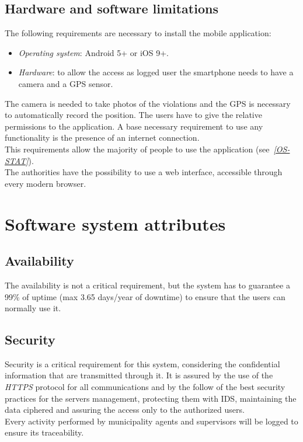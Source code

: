 \documentclass[a4paper]{report}
\begin{document}
\subsection{Hardware and software limitations}
The following requirements are necessary to install the mobile application:
\begin{itemize}
\item \textit{Operating system}: Android 5+ or iOS 9+.
\item \textit{Hardware}: to allow the access as logged user the smartphone needs to have a camera and a GPS sensor.
\end{itemize}
The camera is needed to take photos of the violations and the GPS is necessary to automatically record the position. The users have to give the relative permissions to the application. A base necessary requirement to use any functionality is the presence of an internet connection.\\
This requirements allow the majority of people to use the application \label{use:os-stats}  \mbox{(see \hyperref[ref:os-stats]{\textit{[OS-STAT]}}).}\\
The authorities have the possibility to use a web interface, accessible through every modern browser.\\
\section{Software system attributes}
\subsection{Availability}
The availability is not a critical requirement, but the system has to guarantee a 99\% of uptime (max 3.65 days/year of downtime) to ensure that the users can normally use it.
\subsection{Security}
Security is a critical requirement for this system, considering the confidential information that are transmitted through it. It is assured by the use of the \textit{HTTPS} protocol for all communications and by the follow of the best security practices for the servers management, protecting them with IDS, maintaining the data ciphered and assuring the access only to the authorized users. \\
Every activity performed by municipality agents and supervisors will be logged to ensure its traceability.
\end{document}
